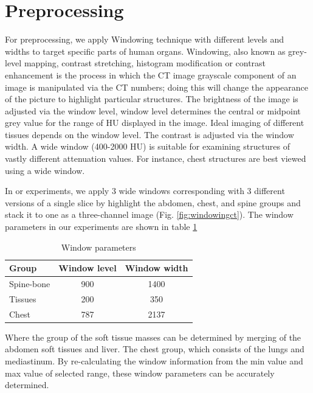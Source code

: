\section{Preprocessing}
\label{sec:preprocess}
For preprocessing, we apply Windowing technique  \cite{windowingct17yahya} with different levels and widths to target specific parts of human organs. Windowing, also known as grey-level mapping, contrast stretching, histogram modification or contrast enhancement is the process in which the CT image grayscale component of an image is manipulated via the CT numbers; doing this will change the appearance of the picture to highlight particular structures. The brightness of the image is adjusted via the window level, window level determines the central or midpoint grey value for the range of HU displayed in the image. Ideal imaging of different tissues depends on the window level. The contrast is adjusted via the window width. A wide window (400-2000 HU) is suitable for examining structures of vastly different attenuation values. For instance, chest structures are best viewed using a wide window.

In or experiments, we apply 3 wide windows corresponding with 3 different versions of a single slice by highlight the abdomen, chest, and spine groups and stack it to one as a three-channel image (Fig. \ref{fig:windowingct}). The window parameters in our experiments are shown in table \ref{table:window_params}
\begin{table}[]
\centering
\caption{Window parameters}\label{table:window_params}
\begin{tabular}{| l | c c |}
\hline
Group      & Window level & Window width \\ \hline
Spine-bone & 900          & 1400         \\ \hline
Tissues    & 200          & 350          \\ \hline
Chest      & 787          & 2137         \\ \hline
\end{tabular}
\end{table}

Where the group of the soft tissue masses can be determined by merging of the abdomen soft tissues and liver. The chest group, which consists of the lungs and mediastinum. By re-calculating the window information from the min value and max value of selected range, these window parameters can be accurately determined.

